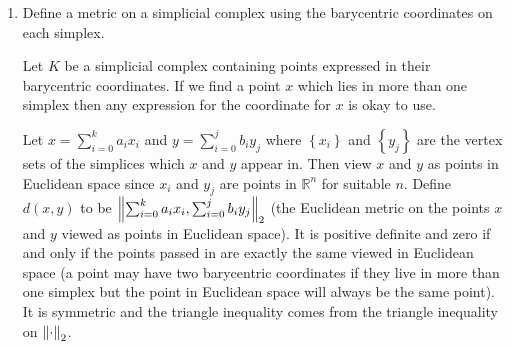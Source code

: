 \documentclass[11pt]{article}
\newcommand{\br}[1]{\left(#1\right)}
\newcommand{\cbr}[1]{\left\{#1\right\}}
\begin{document}
\begin{enumerate}
\begin{proof}
        Conversely, suppose that $\cbr{x_0,\dots,x_k}$ is not geometrically independent so that we may find a nontrivial linear combination $\sum_{i=1}^k c_i(x_i-x_0)$ which vanishes. Without loss of generality we may choose $c_i$ such that $\sum_{i=1}^k c_i = 1$, since we could divide each $c_i$ by $\sum_{i=1}^k c_i$ and still obtain a nontrivial vanishing linear combination of elements $x_i-x_0$. As a result we obtain that $\sum_{i=1}^kc_kx_k = \sum_{i=1}^kc_kx_0 = x_0$, and by choosing some $x$ with barycentric coordinates $\sum_{i=0}^k a_ix_i$ such that $0<a_0\leq a_1\leq\cdots\leq a_k$, we can form new barycentric coordinates $0x_0 + \sum_{i=1}^k(a_0c_i+a_i)x_k$. The sum of the coefficients is $\sum_{i=1}^k(a_0c_i+a_i) = a_0\br{\sum_{i=1}^kc_k} + \sum_{i=1}^ka_k = \sum_{i=0}^ka_k = 1$, and each coefficient $a_0c_i+a_i$ is nonnegative since $a_i\geq a_0$ and $c_i\leq 1$ for all $i\geq 1$.
        
        The two coordinates given are distinct since the first one has a nonzero coefficient for $x_0$ whereas the coefficient for the second has zero as the coefficient.

        Hence the collection $\cbr{x_0,\dots,x_k}\subset \mathbb{R}^N$ is geometrically independent if and only if each point in the simplex they span has a unique barycentric coordinate.
    \end{proof}
    \item Define a metric on a simplicial complex using the barycentric coordinates on each simplex. 
    
    Let $K$ be a simplicial complex containing points expressed in their barycentric coordinates. If we find a point $x$ which lies in more than one simplex then any expression for the coordinate for $x$ is okay to use.

    Let $x = \sum_{i=0}^k a_ix_i$ and $y = \sum_{i=0}^j b_iy_j$ where $\cbr{x_i}$ and $\cbr{y_j}$ are the vertex sets of the simplices which $x$ and $y$ appear in. Then view $x$ and $y$ as points in Euclidean space since $x_i$ and $y_j$ are points in $\mathbb{R}^n$ for suitable $n$. Define $d(x,y)$ to be $\norm{\sum_{i=0}^k a_ix_i,\sum_{i=0}^j b_iy_j}_2$ (the Euclidean metric on the points $x$ and $y$ viewed as points in Euclidean space). It is positive definite and zero if and only if the points passed in are exactly the same viewed in Euclidean space (a point may have two barycentric coordinates if they live in more than one simplex but the point in Euclidean space will always be the same point). It is symmetric and the triangle inequality comes from the triangle inequality on $\norm{\cdot}_2$.


\end{enumerate}
\end{document}
